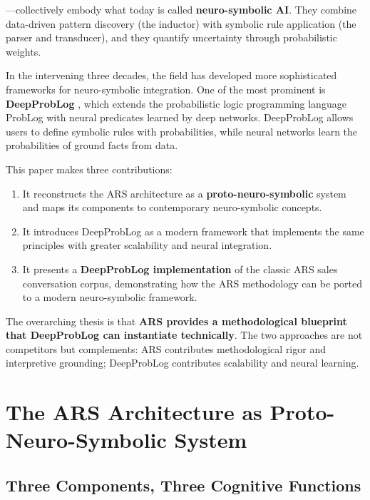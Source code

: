 \documentclass[12pt,a4paper]{article}
\begin{document}
—collectively embody what today is called \textbf{neuro-symbolic AI}. They combine 
data-driven pattern discovery (the inductor) with symbolic rule application 
(the parser and transducer), and they quantify uncertainty through probabilistic 
weights.

In the intervening three decades, the field has developed more sophisticated 
frameworks for neuro-symbolic integration. One of the most prominent is 
\textbf{DeepProbLog} \citep{manhaeve2018deepproblog}, which extends the 
probabilistic logic programming language ProbLog with neural predicates learned 
by deep networks. DeepProbLog allows users to define symbolic rules with 
probabilities, while neural networks learn the probabilities of ground facts 
from data.

This paper makes three contributions:

\begin{enumerate}
    \item It reconstructs the ARS architecture as a \textbf{proto-neuro-symbolic} 
    system and maps its components to contemporary neuro-symbolic concepts.
    
    \item It introduces DeepProbLog as a modern framework that implements the 
    same principles with greater scalability and neural integration.
    
    \item It presents a \textbf{DeepProbLog implementation} of the classic ARS 
    sales conversation corpus, demonstrating how the ARS methodology can be 
    ported to a modern neuro-symbolic framework.
\end{enumerate}

The overarching thesis is that \textbf{ARS provides a methodological blueprint 
that DeepProbLog can instantiate technically}. The two approaches are not 
competitors but complements: ARS contributes methodological rigor and 
interpretive grounding; DeepProbLog contributes scalability and neural learning.

\section{The ARS Architecture as Proto-Neuro-Symbolic System}

\subsection{Three Components, Three Cognitive Functions}
\end{document}

